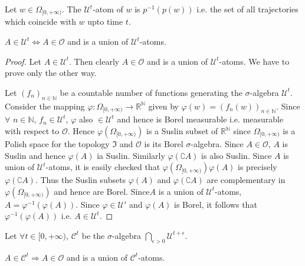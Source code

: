 Let $w \in \Omega_{[0,+\infty)}$. The $\mathcal{U}^t$-atom of $w$ is
  $p^{-1} (p(w))$  i.e. the set of all trajectories which coincide
  with $w$ upto time $t$.

\begin{proposition}\label{part2:chap7:prop108}
$A \in \mathcal{U}^t \Longleftrightarrow A \in \mathscr{O}$ and is a union
  of $\mathcal{U}^t$-atoms.
\end{proposition}

\begin{proof}
Let $A \in \mathcal{U}^t$. Then clearly $A \in \mathscr{O}$ and is a
union of $\mathcal{U}^t$-atoms. We have to prove only the other way.

Let  $(f_n)_{n \in \mathbb{N}}$ be a countable number of functions
generating the $\sigma$-algebra $\mathcal{U}^t$. Consider the mapping
$\varphi: \Omega_{[0,+\infty)} \to \mathbb{R}^\mathbb{N}$ given by
  $\varphi(w) = (f_n(w))_{n\in\mathbb{N}}$. Since $\forall$
  $n \in \mathbb{N}$, $f_n \in \mathcal{U}^t$, $\varphi$ also $\in
  \mathcal{U}^t$ and hence is Borel measurable i.e. measurable with
  respect to $\mathscr{O}$. Hence $\varphi (\Omega_{[0,+\infty)})$ is
    a Suslin subset of $\mathbb{R}^\mathbb{N}$ since
    $\Omega_{[0,+\infty)}$ is a Polish space for the topology
      $\mathfrak{I}$ and $\mathscr{O}$ is its Borel
      $\sigma$-algebra. Since $A \in \mathscr{O}$, $A$ is Suslin and
      hence $\varphi(A)$ ia Suslin. Similarly $\varphi(\complement A)$
      is also Suslin. Since $A$ is union of $\mathcal{U}^t$-atoms, it
      is easily checked that
      $\varphi(\Omega_{[0,+\infty)}) \varphi(A)$ is precisely
        $\varphi(\complement A)$. Thus the Suslin subsets $\varphi(A)$
        and $\varphi(\complement A)$ are complementary in
        $\varphi(\Omega_{[0,+\infty)})$ and hence are
          Borel. Since\pageoriginale $A$ is a union of
          $\mathcal{U}^t$-atoms, $A = \varphi^{-1}(\varphi(A))$. Since
          $\varphi \in \mathcal{U}'$ and $\varphi(A)$ is Borel, it
          follows that $\varphi^{-1}(\varphi(A))$ i.e. $A \in
          \mathcal{U}^t$. 
\end{proof}

Let $\forall t \in [0,+\infty)$, $\mathscr{C}^t$ be the
  $\sigma$-algebra $\bigcap\limits_{\epsilon >0} \mathcal{U}^{t+
    \epsilon}$.

\begin{corollary}\label{part2:chap7:coro109}
$A \in \mathscr{C}^t \Longrightarrow A \in \mathscr{O}$ and is a union
  of $\mathscr{C}^t$-atoms.
\end{corollary}


